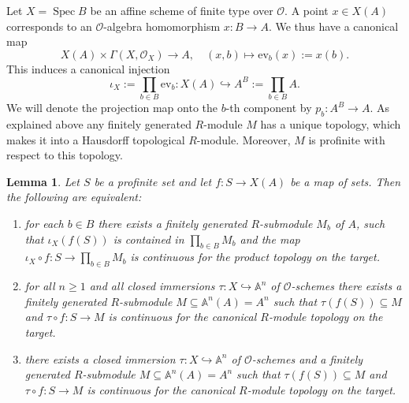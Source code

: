 \documentclass{amsart}
\newtheorem{lem}[prop]{Lemma}
\theoremstyle{definition}
\theoremstyle{remark}
\DeclareMathOperator{\Spec}{Spec}
\newcommand{\ev}{\mathrm{ev}}
\newcommand{\OO}{\mathcal O}
\begin{document}
Let $X=\Spec B$ be an affine scheme of finite type
over $\OO$. A point $x\in X(A)$ corresponds
to an $\OO$-algebra homomorphism $x: B\rightarrow A$. We thus have a canonical map
$$ X(A)\times \Gamma(X, \OO_X)\rightarrow A, \quad (x, b)\mapsto \ev_b(x):= x(b).$$
This induces a canonical injection 
$$\iota_X:=\prod_{b\in B}\ev_b: X(A) \hookrightarrow A^B:= \prod_{b\in B} A.$$
We will denote the projection map onto the $b$-th component by $p_b: A^B\rightarrow A$. 
As explained above any finitely generated $R$-module $M$ has a unique topology, which makes
it into a  Hausdorff topological $R$-module. Moreover, $M$ is profinite with respect to this topology. 

\begin{lem}\label{B1} Let $S$ be a profinite set and let $f: S\rightarrow X(A)$ be a map of sets. Then the following
are equivalent: 
\begin{enumerate}
\item for each $b\in B$ there exists a finitely generated $R$-submodule $M_b$ of $A$, such that 
$\iota_X(f (S))$ is contained in $\prod_{b\in B} M_b$ and the map 
$\iota_X\circ f: S \rightarrow \prod_{b\in B} M_b$ is continuous for the product topology on the target.
\item for all $n\ge 1$ and all closed immersions $\tau: X\hookrightarrow \mathbb A^n$ of $\OO$-schemes there exists 
a finitely generated $R$-submodule $M \subseteq \mathbb A^n(A)= A^n$ such that 
$\tau(f(S)) \subseteq M$ and $\tau\circ f: S \rightarrow M$ is continuous for the canonical $R$-module topology on the target.
\item there exists a closed immersion $\tau: X\hookrightarrow \mathbb A^n$ of $\OO$-schemes and a finitely generated $R$-submodule $M \subseteq \mathbb A^n(A)=A^n$ such that $\tau(f(S)) \subseteq M$ and $\tau\circ f: S \rightarrow M$ is continuous for the canonical $R$-module topology  on the target.
\end{enumerate}
\end{lem}
\end{document}
